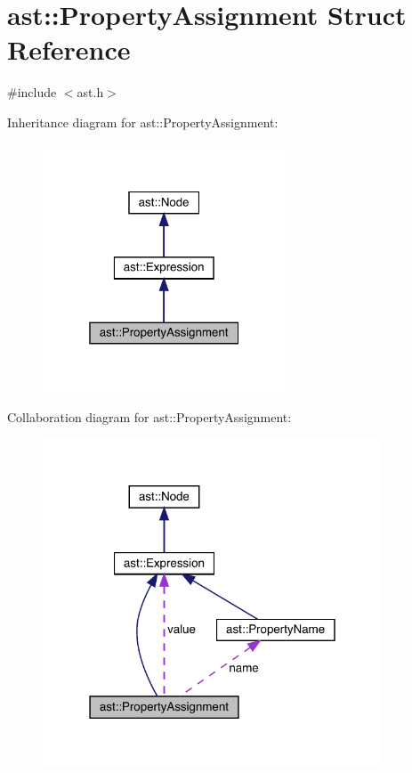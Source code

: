 \hypertarget{structast_1_1_property_assignment}{}\section{ast\+:\+:Property\+Assignment Struct Reference}
\label{structast_1_1_property_assignment}


{\ttfamily \#include $<$ast.\+h$>$}



Inheritance diagram for ast\+:\+:Property\+Assignment\+:\nopagebreak
\begin{figure}[H]
\begin{center}
\leavevmode
\includegraphics[width=205pt]{structast_1_1_property_assignment__inherit__graph}
\end{center}
\end{figure}


Collaboration diagram for ast\+:\+:Property\+Assignment\+:\nopagebreak
\begin{figure}[H]
\begin{center}
\leavevmode
\includegraphics[width=286pt]{structast_1_1_property_assignment__coll__graph}
\end{center}
\end{figure}
